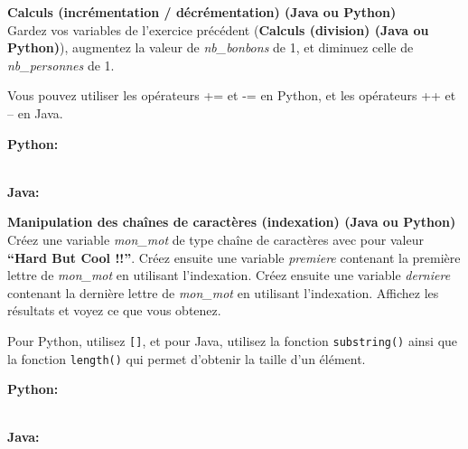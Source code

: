 \begin{Exercice}[5 minutes] \textbf{Calculs (incrémentation / décrémentation) (Java ou Python)}\\
   Gardez vos variables de l'exercice précédent (\textbf{Calculs (division) (Java ou Python)}), augmentez la valeur de \textit{nb\_bonbons} de 1, et diminuez celle de \textit{nb\_personnes} de 1.  \\
   
    \begin{conseil}
      	Vous pouvez utiliser les opérateurs += et -= en Python, et les opérateurs ++ et -- en Java.
        
    \end{conseil}
    \begin{solution}
    
    \textbf{Python:}
    
    
    \textbf{\\Java:}
    
           
    \end{solution}   
\end{Exercice}

\begin{Exercice}[5 minutes] \textbf{Manipulation des chaînes de caractères (indexation) (Java ou Python)}\\
   Créez une variable \textit{mon\_mot} de type chaîne de caractères avec pour valeur \textbf{``Hard But Cool !!''}. Créez ensuite une variable \textit{premiere} contenant la première lettre de \textit{mon\_mot} en utilisant l'indexation. Créez ensuite une variable \textit{derniere} contenant la dernière lettre de \textit{mon\_mot} en utilisant l'indexation. Affichez les résultats et voyez ce que vous obtenez. \\
   
    \begin{conseil}
      	Pour Python, utilisez \lstinline{[]}, et pour Java, utilisez la fonction \lstinline{substring()} ainsi que la fonction \lstinline{length()} qui permet d'obtenir la taille d'un élément.
        
    \end{conseil}
    \begin{solution}
    
    \textbf{Python:}
    
    
    \textbf{\\Java:}
    
           
    \end{solution}   
\end{Exercice}


